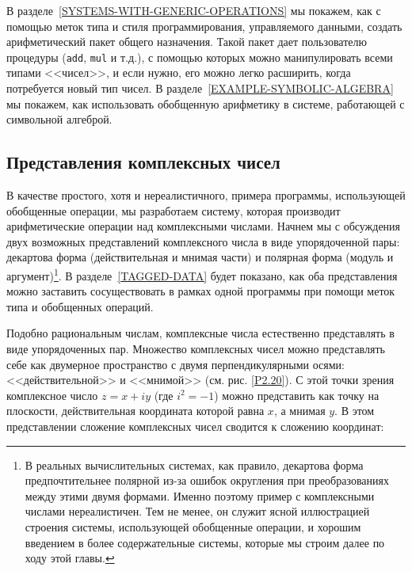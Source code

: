В разделе~\ref{SYSTEMS-WITH-GENERIC-OPERATIONS} мы 
покажем, как с помощью меток типа и стиля программирования,
управляемого данными, создать арифметический пакет общего назначения.
Такой пакет дает пользователю процедуры ({\tt add}, {\tt mul} и
т.д.), с помощью которых можно манипулировать всеми типами <<чисел>>, и 
если нужно, его можно легко расширить, когда потребуется новый тип
чисел.  В разделе~\ref{EXAMPLE-SYMBOLIC-ALGEBRA} мы
покажем, как использовать обобщенную арифметику в системе, работающей с
символьной алгеброй.


\subsection{Представления комплексных чисел}
\label{REPRESENTATIONS-FOR-COMPLEX-NUMBERS}


В качестве простого, хотя и нереалистичного, примера программы,
использующей обобщенные операции, мы разработаем систему, которая
производит арифметические операции над комплексными числами.  Начнем
мы с обсуждения двух возможных представлений комплексного числа в виде 
упорядоченной пары: 
декартова форма (действительная и мнимая части) и
полярная форма (модуль и аргумент)\footnote{В реальных вычислительных системах, как правило,
декартова форма предпочтительнее полярной из-за   ошибок округления при
преобразованиях между этими двумя формами.  Именно поэтому пример с
комплексными числами нереалистичен.  Тем не менее, он служит ясной
иллюстрацией строения системы, использующей обобщенные операции, и
хорошим введением в более содержательные системы, которые мы строим
далее по ходу этой главы.}.
В разделе~\ref{TAGGED-DATA} будет показано, как оба
представления можно заставить сосуществовать в рамках одной программы
при помощи меток типа и обобщенных операций.

Подобно рациональным числам, комплексные числа естественно
представлять в виде упорядоченных пар.  Множество комплексных чисел
можно представлять себе как двумерное пространство с двумя
перпендикулярными осями: <<действительной>> и <<мнимой>> (см. рис.
\ref{P2.20}).  С этой точки зрения комплексное число $z 
= x + iy$ (где $i^2 = -1$) можно представить как
точку на плоскости, действительная координата которой равна 
$x$,
а мнимая $y$.  В этом представлении сложение комплексных
чисел сводится к сложению координат:

